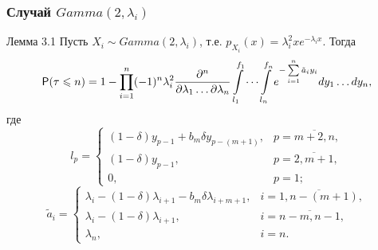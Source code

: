 \documentclass[10pt]{beamer}
\newcommand{\p}{{\sf P}}
\theoremstyle{definition}
\theoremstyle{remark}
\begin{document}
\begin{frame}\frametitle{Случай $Gamma(2,\lambda_i)$}
	\begin{block}{Лемма 3.1}
		Пусть $X_i \sim Gamma(2, \lambda_i)$, т.е. $p_{X_i} (x) = \lambda_i^2 x e^{-\lambda_i x}$. Тогда
	\begin{equation*}\label{my_trick}
		\p(\tau \leqslant n) = 1 -
		\prod_{i=1}^n (-1)^n \lambda^2_i \frac{\partial^n}{\partial \lambda_1 \dots \partial \lambda_n} \int\limits_{l_1}^{f_1}\cdots \int\limits_{l_n}^{f_n} e^{-\sum\limits_{i=1}^n \tilde a_i y_i} dy_1 \ldots dy_n,
	\end{equation*}
	где 
		$$l_p = 
		\begin{cases} 
			(1-\delta)y_{p-1} + b_m \delta y_{p-(m+1)},& p = \overline{m+2, n}, \\ 
			(1-\delta)y_{p-1},& p = \overline{2, m+1}, \\ 
			0,& p=1;
		\end{cases}$$
		$$\tilde a_i = 
		\begin{cases} 
			\lambda_i - (1-\delta)\lambda_{i+1} - b_m \delta \lambda_{i+m+1},& i = \overline{1, n-(m+1)}, \\
		 	\lambda_i - (1-\delta)\lambda_{i+1},& i = \overline{n-m, n-1}, \\ 
			\lambda_n,& i = n. 
		\end{cases}$$
	\end{block}
\end{frame}

\end{document}
